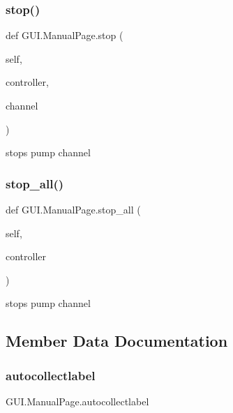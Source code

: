 \mbox{\label{class_g_u_i_1_1_manual_page_a14d88e9b478d9bb8828c0639dd258d1e}} 
\subsubsection{\texorpdfstring{stop()}{stop()}}
{\footnotesize\ttfamily def G\+U\+I.\+Manual\+Page.\+stop (\begin{DoxyParamCaption}\item[{}]{self,  }\item[{}]{controller,  }\item[{}]{channel }\end{DoxyParamCaption})}

\begin{DoxyVerb}stops pump channel\end{DoxyVerb}
 \mbox{\label{class_g_u_i_1_1_manual_page_a6e9cb2efbec0918bb12f6bc9f26fbfde}} 
\subsubsection{\texorpdfstring{stop\_all()}{stop\_all()}}
{\footnotesize\ttfamily def G\+U\+I.\+Manual\+Page.\+stop\+\_\+all (\begin{DoxyParamCaption}\item[{}]{self,  }\item[{}]{controller }\end{DoxyParamCaption})}

\begin{DoxyVerb}stops pump channel\end{DoxyVerb}
 

\subsection{Member Data Documentation}
\mbox{\label{class_g_u_i_1_1_manual_page_a4f62f9cd9b897df513e1fc8818218f35}} 
\subsubsection{\texorpdfstring{autocollectlabel}{autocollectlabel}}
{\footnotesize\ttfamily G\+U\+I.\+Manual\+Page.\+autocollectlabel}

